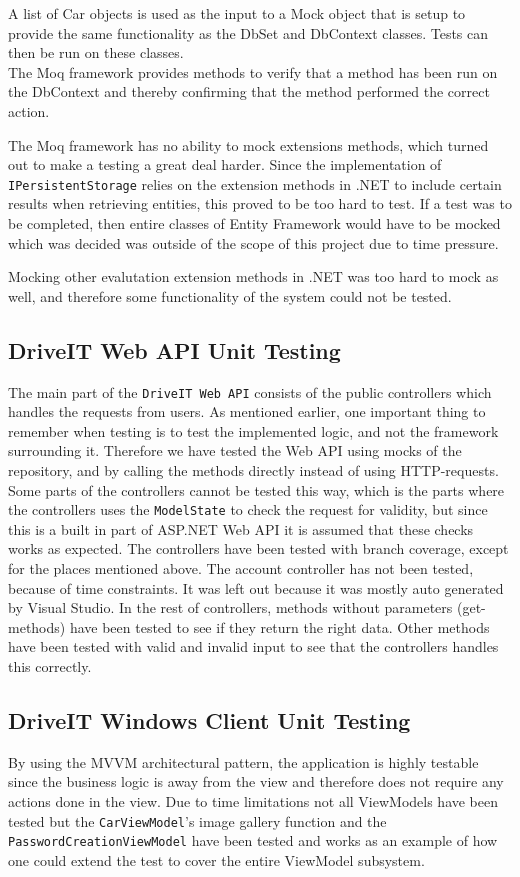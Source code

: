 A list of Car objects is used as the input to a Mock object that is setup to provide the same functionality as the DbSet and DbContext classes. Tests can then be run on these classes.\\
The Moq framework provides methods to verify that a method has been run on the DbContext and thereby confirming that the method performed the correct action. 

The Moq framework has no ability to mock extensions methods, which turned out to make a testing a great deal harder. Since the implementation of \texttt{IPersistentStorage} relies on the extension methods in .NET to include certain results when retrieving entities, this proved to be too hard to test. If a test was to be completed, then entire classes of Entity Framework would have to be mocked which was decided was outside of the scope of this project due to time pressure.

Mocking other evalutation extension methods in .NET was too hard to mock as well, and therefore some functionality of the system could not be tested.

\subsection{DriveIT Web API Unit Testing}
The main part of the \texttt{DriveIT Web API} consists of the public controllers which handles the requests from users. As mentioned earlier, one important thing to remember when testing is to test the implemented logic, and not the framework surrounding it. Therefore we have tested the Web API using mocks of the repository, and by calling the methods directly instead of using HTTP-requests.
Some parts of the controllers cannot be tested this way, which is the parts where the controllers uses the \texttt{ModelState} to check the request for validity, but since this is a built in part of ASP.NET Web API it is assumed that these checks works as expected.
The controllers have been tested with branch coverage, except for the places mentioned above.
The account controller has not been tested, because of time constraints. It was left out because it was mostly auto generated by Visual Studio. 
In the rest of controllers, methods without parameters (get-methods) have been tested to see if they return the right data. Other methods have been tested with valid and invalid input to see that the controllers handles this correctly.

\subsection{DriveIT Windows Client Unit Testing}
By using the MVVM architectural pattern, the application is highly testable since the business logic is away from the view and therefore does not require any actions done in the view. Due to time limitations not all ViewModels have been tested but the \texttt{CarViewModel}'s image gallery function and the \texttt{PasswordCreationViewModel} have been tested and works as an example of how one could extend the test to cover the entire ViewModel subsystem.

